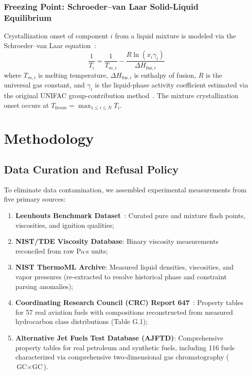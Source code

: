 \documentclass[11pt,a4paper]{article}
\begin{document}
\subsubsection{Freezing Point: Schroeder--van Laar Solid-Liquid Equilibrium}
Crystallization onset of component $i$ from a liquid mixture is modeled via the Schroeder--van Laar equation~\cite{schroeder1893erstarrung}:
\begin{equation}
    \frac{1}{T_i} = \frac{1}{T_{m,i}} - \frac{R \ln(x_i \gamma_i)}{\Delta H_{\text{fus},i}}
    \label{eq:svl}
\end{equation}
where $T_{m,i}$ is melting temperature, $\Delta H_{\text{fus},i}$ is enthalpy of fusion, $R$ is the universal gas constant, and $\gamma_i$ is the liquid-phase activity coefficient estimated via the original UNIFAC group-contribution method~\cite{fredenslund1975group}. The mixture crystallization onset occurs at $T_{\text{freeze}} = \max_{1 \le i \le N} T_i$.

\section{Methodology}

\subsection{Data Curation and Refusal Policy}
To eliminate data contamination, we assembled experimental measurements from five primary sources:
\begin{enumerate}
    \item \textbf{Leenhouts Benchmark Dataset}~\cite{leenhouts2024benchmarking}: Curated pure and mixture flash points, viscosities, and ignition qualities;
    \item \textbf{NIST/TDE Viscosity Database}: Binary viscosity measurements reconciled from raw Pa$\cdot$s units;
    \item \textbf{NIST ThermoML Archive}: Measured liquid densities, viscosities, and vapor pressures (re-extracted to resolve historical phase and constraint parsing anomalies);
    \item \textbf{Coordinating Research Council (CRC) Report 647}~\cite{crc647report}: Property tables for 57 real aviation fuels with compositions reconstructed from measured hydrocarbon class distributions (Table G.1);
    \item \textbf{Alternative Jet Fuels Test Database (AJFTD)}: Comprehensive property tables for real petroleum and synthetic fuels, including 116 fuels characterized via comprehensive two-dimensional gas chromatography ($\text{GC}\times\text{GC}$).
\end{enumerate}
\end{document}
